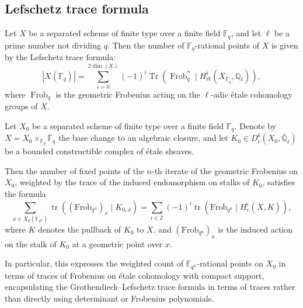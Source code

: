 \subsection{Lefschetz trace formula}

\begin{theorem}
Let $X$ be a separated scheme of finite type over a finite field $\mathbb{F}_q$, and let $\ell$ be a prime number not dividing $q$. Then the number of $\mathbb{F}_q$-rational points of $X$ is given by the Lefschetz trace formula:
$$
|X(\mathbb{F}_q)| = \sum_{i=0}^{2 \dim(X)} (-1)^i \operatorname{Tr}(\operatorname{Frob}_q^* \mid H^i_{\text{ét}}(X_{\overline{\mathbb{F}}_q}, \mathbb{Q}_\ell)),
$$
where $\operatorname{Frob}_q$ is the geometric Frobenius acting on the $\ell$-adic étale cohomology groups of $X$.

\end{theorem}



\begin{theorem}
Let $X_0$ be a separated scheme of finite type over a finite field $\mathbb{F}_q$. Denote by $\overline{X} = X_0 \times_{\mathbb{F}_q} \overline{\mathbb{F}}_q$ the base change to an algebraic closure, and let $K_0 \in D_c^b(X_0, \overline{\mathbb{Q}}_\ell)$ be a bounded constructible complex of étale sheaves.

Then the number of fixed points of the $n$-th iterate of the geometric Frobenius on $X_0$, weighted by the trace of the induced endomorphism on stalks of $K_0$, satisfies the formula
$$
\sum_{x \in X_0(\mathbb{F}_{q^n})} \operatorname{tr}\left( ( \mathrm{Frob}_{q^n} )_x \mid K_{0,\overline{x}} \right) = \sum_{i \in \mathbb{Z}} (-1)^i \operatorname{tr}\left( \mathrm{Frob}_{q^n} \mid H_c^i(\overline{X}, K) \right),
$$
where $K$ denotes the pullback of $K_0$ to $\overline{X}$, and $( \mathrm{Frob}_{q^n} )_x$ is the induced action on the stalk of $K_0$ at a geometric point over $x$.

In particular, this expresses the weighted count of $\mathbb{F}_{q^n}$-rational points on $X_0$ in terms of traces of Frobenius on étale cohomology with compact support, encapsulating the Grothendieck–Lefschetz trace formula in terms of traces rather than directly using determinant or Frobenius polynomials.
\end{theorem}



